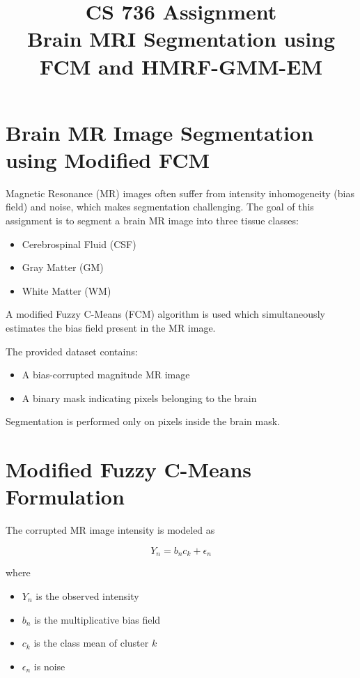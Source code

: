 \documentclass[11pt]{article}
\title{CS 736 Assignment \\ Brain MRI Segmentation using FCM and HMRF-GMM-EM}
\author{}
\date{}
\begin{document}
\maketitle

\section{Brain MR Image Segmentation using Modified FCM}

Magnetic Resonance (MR) images often suffer from intensity inhomogeneity (bias field) and noise, which makes segmentation challenging. The goal of this assignment is to segment a brain MR image into three tissue classes:

\begin{itemize}
\item Cerebrospinal Fluid (CSF)
\item Gray Matter (GM)
\item White Matter (WM)
\end{itemize}

A modified Fuzzy C-Means (FCM) algorithm is used which simultaneously estimates the bias field present in the MR image.

The provided dataset contains:

\begin{itemize}
\item A bias-corrupted magnitude MR image
\item A binary mask indicating pixels belonging to the brain
\end{itemize}

Segmentation is performed only on pixels inside the brain mask.

\section{Modified Fuzzy C-Means Formulation}

The corrupted MR image intensity is modeled as

\[
Y_n = b_n c_k + \epsilon_n
\]

where

\begin{itemize}
\item $Y_n$ is the observed intensity
\item $b_n$ is the multiplicative bias field
\item $c_k$ is the class mean of cluster $k$
\item $\epsilon_n$ is noise
\end{itemize}
\end{document}
